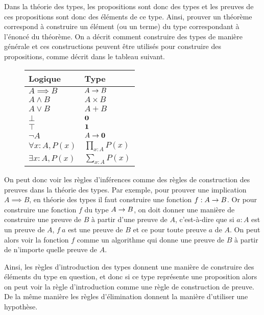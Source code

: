 \documentclass[../../rapport.tex]{subfiles}
\begin{document}
  Dans la théorie des types, les propositions sont donc des types et les preuves de ces propositions sont donc des éléments de ce type.
  Ainsi, prouver un théorème correspond à construire un élément (ou un terme) du type correspondant à l'énoncé du théorème.
  On a décrit comment construire des types de manière générale et ces constructions peuvent être utilisés pour construire des propositions,
  comme décrit dans le tableau suivant.

  \begin{figure}[ht]
    \centering
    \begin{tabular}{m{3cm} l}
      Logique & Type \vspace{0.4em} \\
      \hline
      \vspace{0.6em}
      $A \implies B$ & $A \rightarrow B$ \\
      $A \wedge B$ & $A \times B$ \\
      $A \vee B$ & $A + B$ \\
      $\bot$ & $\operatorname{\textbf{0}}$ \\
      $\top$ & $\operatorname{\textbf{1}}$ \\
      $\neg A$ & $A \rightarrow \operatorname{\textbf{0}}$ \vspace{0.2em}\\
      \hline \vspace{0.5em}
      $\forall x : A, P(x)$ & $\prod_{x:A}P(x)$ \\
      $\exists x : A, P(x)$ & $\sum_{x:A}P(x)$ \\
    \end{tabular}
  \end{figure}

  On peut donc voir les règles d'inférences comme des règles de construction des preuves dans la théorie des types.
  Par exemple, pour prouver une implication $A \implies B$, en théorie des types il faut construire une fonction $f : A \rightarrow B$.
  Or pour construire une fonction $f$ du type $A \rightarrow B$,
  on doit donner une manière de construire une preuve de $B$ à partir d'une preuve de $A$,
  c'est-à-dire que si $a : A$ est un preuve de $A$, $f\ a$ est une preuve de $B$ et ce pour toute preuve $a$ de $A$.
  On peut alors voir la fonction $f$ comme un algorithme qui donne une preuve de $B$ à partir de n'importe quelle preuve de $A$.

  Ainsi, les règles d'introduction des types donnent une manière de construire des éléments du type en question,
  et donc si ce type représente une proposition alors on peut voir la règle d'introduction comme une règle de construction de preuve.
  De la même manière les règles d'élimination donnent la manière d'utiliser une hypothèse.
\end{document}
